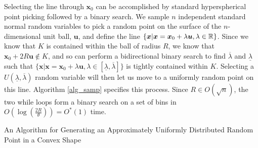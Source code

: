 Selecting the line through $\bm{x}_0$ can be accomplished by standard hyperspherical point picking \cite{mathworld_picking} followed by a binary search. We sample $n$ independent standard normal random variables to pick a random point on the surface of the $n$-dimensional unit ball, $\bm{u}$, and define the line $\{\bm{x} | \bm{x} = \bm{x}_0 + \lambda \bm{u}, \lambda \in \mathbb{R} \}$. Since we know that $K$ is contained within the ball of radius $R$, we know that $\bm{x}_0 + 2R\bm{u} \notin K$, and so can perform a bidirectional binary search to find $\overline{\lambda}$ and $\underline{\lambda}$ such that $\{\bm{x} | \bm{x} = \bm{x}_0 + \lambda \bm{u}, \lambda \in [\underline{\lambda}, \overline{\lambda}] \}$ is tightly contained within $K$. Selecting a $U(\underline{\lambda}, \overline{\lambda})$ random variable will then let us move to a uniformly random point on this line. Algorithm \ref{alg_samp} specifies this process. Since $R \in O(\sqrt{n})$, the two while loops form a binary search on a set of bins in $O(\log(\frac{2R}{\theta})) = O^{*}(1)$ time. 

\begin{algorithm}
\SetAlgoLined
{}

\caption{An Algorithm for Generating an Approximately Uniformly Distributed Random Point in a Convex Shape}\label{alg_samp}

\end{algorithm}


